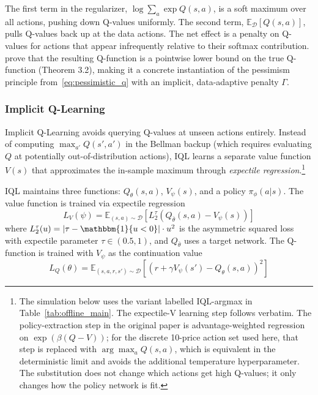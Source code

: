 The first term in the regularizer, $\log \sum_a \exp Q(s,a)$, is a soft maximum over all actions, pushing down Q-values uniformly. The second term, $\mathbb{E}_{\mathcal{D}}[Q(s,a)]$, pulls Q-values back up at the data actions. The net effect is a penalty on Q-values for actions that appear infrequently relative to their softmax contribution. \citet{Kumar2020} prove that the resulting Q-function is a pointwise lower bound on the true Q-function (Theorem 3.2), making it a concrete instantiation of the pessimism principle from~\eqref{eq:pessimistic_q} with an implicit, data-adaptive penalty $\Gamma$.

\subsubsection{Implicit Q-Learning}

Implicit Q-Learning \citep[IQL,][]{Kostrikov2022} avoids querying Q-values at unseen actions entirely. Instead of computing $\max_{a'} Q(s', a')$ in the Bellman backup (which requires evaluating $Q$ at potentially out-of-distribution actions), IQL learns a separate value function $V(s)$ that approximates the in-sample maximum through \textit{expectile regression}.\footnote{The simulation below uses the variant labelled IQL-argmax in Table~\ref{tab:offline_main}. The expectile-V learning step follows \citet{Kostrikov2022} verbatim. The policy-extraction step in the original paper is advantage-weighted regression on $\exp(\beta(Q-V))$; for the discrete 10-price action set used here, that step is replaced with $\arg\max_a Q(s,a)$, which is equivalent in the deterministic limit and avoids the additional temperature hyperparameter. The substitution does not change which actions get high Q-values; it only changes how the policy network is fit.}

\begin{definition}
\label{def:iql}
IQL maintains three functions: $Q_\theta(s,a)$, $V_\psi(s)$, and a policy $\pi_\phi(a|s)$. The value function is trained via expectile regression
\begin{equation}
\label{eq:iql_v}
L_V(\psi) = \mathbb{E}_{(s,a) \sim \mathcal{D}}\left[L_2^\tau(Q_{\bar{\theta}}(s,a) - V_\psi(s))\right]
\end{equation}
where $L_2^\tau(u) = |\tau - \mathbbm{1}\{u < 0\}| \cdot u^2$ is the asymmetric squared loss with expectile parameter $\tau \in (0.5, 1)$, and $Q_{\bar{\theta}}$ uses a target network. The Q-function is trained with $V_\psi$ as the continuation value
\begin{equation}
\label{eq:iql_q}
L_Q(\theta) = \mathbb{E}_{(s,a,r,s') \sim \mathcal{D}}\left[(r + \gamma V_\psi(s') - Q_\theta(s,a))^2\right]
\end{equation}
\end{definition}

